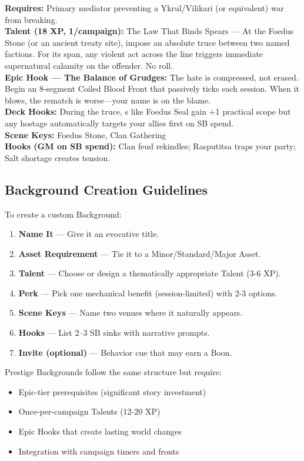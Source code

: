 \documentclass[12pt]{article}
\begin{document}
\begin{description}[leftmargin=*]
  \item[\textbf{Keeper of the Foedus Stone}] 
  \textbf{Requires:} Primary mediator preventing a Ykrul/Vilikari (or equivalent) war from breaking. \\
  \textbf{Talent (18 XP, 1/campaign):} The Law That Binds Spears --- At the Foedus Stone (or an ancient treaty site), impose an absolute truce between two named factions. For its span, any violent act across the line triggers immediate supernatural calamity on the offender. No roll. \\
  \textbf{Epic Hook --- The Balance of Grudges:} The hate is compressed, not erased. Begin an 8-segment Coiled Blood Front that passively ticks each session. When it blows, the rematch is worse---your name is on the blame. \\
  \textbf{Deck Hooks:} During the truce, s like Foedus Seal gain +1 practical scope but any hostage automatically targets your allies first on SB spend. \\
  \textbf{Scene Keys:} Foedus Stone, Clan Gathering \\
  \textbf{Hooks (GM on SB spend):} Clan feud rekindles; Rasputitsa traps your party; Salt shortage creates tension.

\end{description}

\subsection*{Background Creation Guidelines}

To create a custom Background:
\begin{enumerate}
  \item \textbf{Name It} --- Give it an evocative title.
  \item \textbf{Asset Requirement} --- Tie it to a Minor/Standard/Major Asset.
  \item \textbf{Talent} --- Choose or design a thematically appropriate Talent (3-6 XP).
  \item \textbf{Perk} --- Pick one mechanical benefit (session-limited) with 2-3 options.
  \item \textbf{Scene Keys} --- Name two venues where it naturally appears.
  \item \textbf{Hooks} --- List 2--3 SB sinks with narrative prompts.
  \item \textbf{Invite (optional)} --- Behavior cue that may earn a Boon.
\end{enumerate}

Prestige Backgrounds follow the same structure but require:
\begin{itemize}
  \item Epic-tier prerequisites (significant story investment)
  \item Once-per-campaign Talents (12-20 XP)
  \item Epic Hooks that create lasting world changes
  \item Integration with campaign timers and fronts
\end{itemize}
\end{document}
